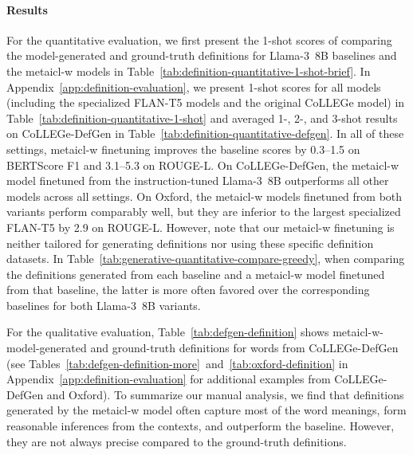 \documentclass{article}
\begin{document}
\paragraph{Results}
For the quantitative evaluation, we first present the 1-shot scores of comparing the model-generated and ground-truth definitions for \mbox{Llama-3 8B} baselines and the \ac{metaicl-w} models in Table~\ref{tab:definition-quantitative-1-shot-brief}. In Appendix~\ref{app:definition-evaluation}, we present 1-shot scores for all models (including the specialized \mbox{FLAN-T5} models and the original \mbox{CoLLEGe} model) in Table~\ref{tab:definition-quantitative-1-shot} and averaged 1-, 2-, and 3-shot results on CoLLEGe-DefGen in Table~\ref{tab:definition-quantitative-defgen}. In all of these settings, \ac{metaicl-w} finetuning improves the baseline scores by 0.3--1.5 on BERTScore F1 and 3.1--5.3 on \mbox{ROUGE-L}. On CoLLEGe-DefGen, the \ac{metaicl-w} model finetuned from the instruction-tuned \mbox{Llama-3 8B} outperforms all other models across all settings. On Oxford, the \ac{metaicl-w} models finetuned from both variants perform comparably well, but they are inferior to the largest specialized \mbox{FLAN-T5} by 2.9 on \mbox{ROUGE-L}. However, note that our \ac{metaicl-w} finetuning is neither tailored for generating definitions nor using these specific definition datasets.
In Table~\ref{tab:generative-quantitative-compare-greedy}, when comparing the definitions generated from each baseline and a \ac{metaicl-w} model finetuned from that baseline, the latter is more often favored over the corresponding baselines for both \mbox{Llama-3 8B} variants.

For the qualitative evaluation, Table~\ref{tab:defgen-definition} shows \ac{metaicl-w}-model-generated and ground-truth definitions for words from CoLLEGe-DefGen (see Tables~\ref{tab:defgen-definition-more}~and~\ref{tab:oxford-definition} in Appendix~\ref{app:definition-evaluation} for additional examples from CoLLEGe-DefGen and Oxford).
To summarize our manual analysis, we find that definitions generated by the \ac{metaicl-w} model often capture most of the word meanings, form reasonable inferences from the contexts, and outperform the baseline. However, they are not always precise compared to the ground-truth definitions.
\end{document}
